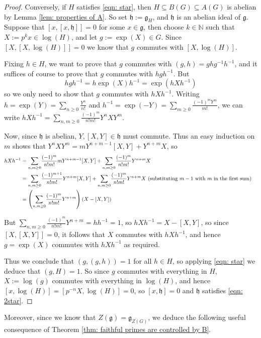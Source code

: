 \documentclass[12pt,a4paper]{article}
\let\\=\cr
\theoremstyle{definition}
\theoremstyle{remark}
\theoremstyle{custthm}
\begin{document}
\begin{proof}
Conversely, if $H$ satisfies \eqref{eqn: star}, then $H\subseteq B(G)\subseteq A(G)$ is abelian by Lemma \ref{lem: properties of A}. So set $\mathfrak{h}:=\mathfrak{g}_H$, and $\mathfrak{h}$ is an abelian ideal of $\mathfrak{g}$. Suppose that $[x,[x,\mathfrak{h}]]=0$ for some $x\in\mathfrak{g}$, then choose $k\in\mathbb{N}$ such that $X:=p^kx\in\log(H)$, and let $g:=\exp(X)\in G$. Since $[X,[X,\log(H)]]=0$ we know that $g$ commutes with $[X,\log(H)]$.

Fixing $h\in H$, we want to prove that $g$ commutes with $(g,h)=ghg^{-1}h^{-1}$, and it suffices of course to prove that $g$ commutes with $hgh^{-1}$. But $$hgh^{-1}=h\exp(X)h^{-1}=\exp(hXh^{-1})$$ so we only need to show that $g$ commutes with $hXh^{-1}$. Writing $h=\exp(Y)=\underset{n\geq 0}{\sum}\frac{Y^n}{n!}$ and $h^{-1}=\exp(-Y)=\underset{m\geq 0}{\sum}\frac{(-1)^mY^m}{m!}$, we can write $hXh^{-1}=\underset{n,m\geq 0}{\sum}\frac{(-1)^{m}}{n!m!}Y^nXY^{m}$.

Now, since $\mathfrak{h}$ is abelian, $Y,[X,Y]\in\mathfrak{h}$ must commute. Thus an easy induction on $m$ shows that $Y^nXY^m=mY^{n+m-1}[X,Y]+Y^{n+m}X$, so 
\begin{align*}
hXh^{-1}&=\underset{n,m\geq 0}{\sum}\frac{(-1)^{m}}{n!m!}mY^{n+m-1}[X,Y]+\underset{n,m\geq 0}{\sum}\frac{(-1)^{m}}{n!m!}Y^{n+m}X\\&=\underset{n,m\geq 0}{\sum}\frac{(-1)^{m+1}}{n!m!}Y^{n+m}[X,Y]+\underset{n,m\geq 0}{\sum}\frac{(-1)^{m}}{n!m!}Y^{n+m}X\text{ (substituting }m-1\text{ with }m\text{ in the first sum)}\\&=\left(\underset{n,m\geq 0}{\sum}\frac{(-1)^{m}}{n!m!}Y^{n+m}\right)(X-[X,Y])
\end{align*}

But $\underset{n,m\geq 0}{\sum}\frac{(-1)^{m}}{n!m!}Y^{n+m}=hh^{-1}=1$, so $hXh^{-1}=X-[X,Y]$, so since $[X,[X,Y]]=0$, it follows that $X$ commutes with $hXh^{-1}$, and hence $g=\exp(X)$ commutes with $hXh^{-1}$ as required.

Thus we conclude that $(g,(g,h))=1$ for all $h\in H$, so applying \eqref{eqn: star} we deduce that $(g,H)=1$. So since $g$ commutes with everything in $H$, $X:=\log(g)$ commutes with everything in $\log(H)$, and hence $[x,\log(H)]=[p^{-n}X,\log(H)]=0$, so $[x,\mathfrak{h}]=0$ and $\mathfrak{h}$ satisfies \eqref{eqn: 2star}.\end{proof}

Moreover, since we know that $Z(\mathfrak{g})=\mathfrak{g}_{Z(G)}$, we deduce the following useful consequence of Theorem \ref{thm: faithful primes are controlled by B}.
\end{document}

